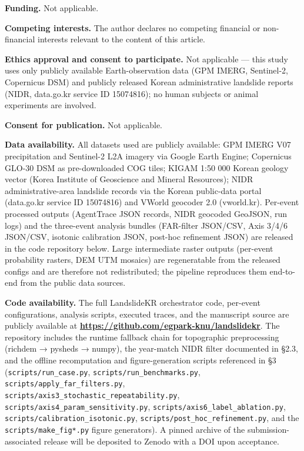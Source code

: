 \documentclass[11pt,a4paper]{article}
\begin{document}
\textbf{Funding.} Not applicable.

\textbf{Competing interests.} The author declares no competing financial or non-financial interests relevant to the content of this article.

\textbf{Ethics approval and consent to participate.} Not applicable --- this study uses only publicly available Earth-observation data (GPM IMERG, Sentinel-2, Copernicus DSM) and publicly released Korean administrative landslide reports (NIDR, data.go.kr service ID 15074816); no human subjects or animal experiments are involved.

\textbf{Consent for publication.} Not applicable.

\textbf{Data availability.} All datasets used are publicly available: GPM IMERG V07 precipitation and Sentinel-2 L2A imagery via Google Earth Engine; Copernicus GLO-30 DSM as pre-downloaded COG tiles; KIGAM 1:50 000 Korean geology vector (Korea Institute of Geoscience and Mineral Resources); NIDR administrative-area landslide records via the Korean public-data portal (data.go.kr service ID 15074816) and VWorld geocoder 2.0 (vworld.kr). Per-event processed outputs (AgentTrace JSON records, NIDR geocoded GeoJSON, run logs) and the three-event analysis bundles (FAR-filter JSON/CSV, Axis 3/4/6 JSON/CSV, isotonic calibration JSON, post-hoc refinement JSON) are released in the code repository below. Large intermediate raster outputs (per-event probability rasters, DEM UTM mosaics) are regeneratable from the released configs and are therefore not redistributed; the pipeline reproduces them end-to-end from the public data sources.

\textbf{Code availability.} The full LandslideKR orchestrator code, per-event configurations, analysis scripts, executed traces, and the manuscript source are publicly available at \textbf{\url{https://github.com/egpark-knu/landslidekr}}. The repository includes the runtime fallback chain for topographic preprocessing (richdem → pysheds → numpy), the year-match NIDR filter documented in §2.3, and the offline recomputation and figure-generation scripts referenced in §3 (\texttt{scripts/run\_case.py}, \texttt{scripts/run\_benchmarks.py}, \texttt{scripts/apply\_far\_filters.py}, \texttt{scripts/axis3\_stochastic\_repeatability.py}, \texttt{scripts/axis4\_param\_sensitivity.py}, \texttt{scripts/axis6\_label\_ablation.py}, \texttt{scripts/calibration\_isotonic.py}, \texttt{scripts/post\_hoc\_refinement.py}, and the \texttt{scripts/make\_fig*.py} figure generators). A pinned archive of the submission-associated release will be deposited to Zenodo with a DOI upon acceptance.
\end{document}
